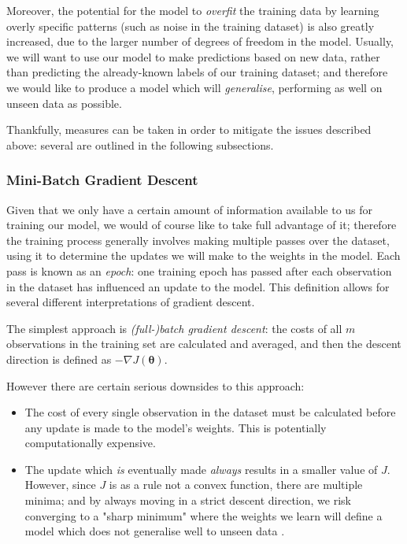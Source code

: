 \documentclass{article}[11pt]
\begin{document}
        Moreover, the potential for the model to \textit{overfit} the training data by learning overly specific patterns (such as noise in the training dataset) is also greatly increased, due to the larger number of degrees of freedom in the model. Usually, we will want to use our model to make predictions based on new data, rather than predicting the already-known labels of our training dataset; and therefore we would like to produce a model which will \textit{generalise}, performing as well on unseen data as possible.
        
        Thankfully, measures can be taken in order to mitigate the issues described above: several are outlined in the following subsections.
        
        
        
        \subsubsection{Mini-Batch Gradient Descent}
            
            Given that we only have a certain amount of information available to us for training our model, we would of course like to take full advantage of it; therefore the training process generally involves making multiple passes over the dataset, using it to determine the updates we will make to the weights in the model. Each pass is known as an \textit{epoch}: one training epoch has passed after each observation in the dataset has influenced an update to the model. This definition allows for several different interpretations of gradient descent.
            
            The simplest approach is \textit{(full-)batch gradient descent}: the costs of all $m$ observations in the training set are calculated and averaged, and then the descent direction is defined as $- \nabla J(\boldsymbol{\theta})$.
            
            However there are certain serious downsides to this approach:
            
            \begin{itemize}
                
                \item The cost of every single observation in the dataset must be calculated before any update is made to the model's weights. This is potentially computationally expensive.
                
                \item The update which \textit{is} eventually made \textit{always} results in a smaller value of $J$. However, since $J$ is as a rule not a convex function, there are multiple minima; and by always moving in a strict descent direction, we risk converging to a "sharp minimum" where the weights we learn will define a model which does not generalise well to unseen data \cite{large_batch}.
                
            \end{itemize}
            
\end{document}
